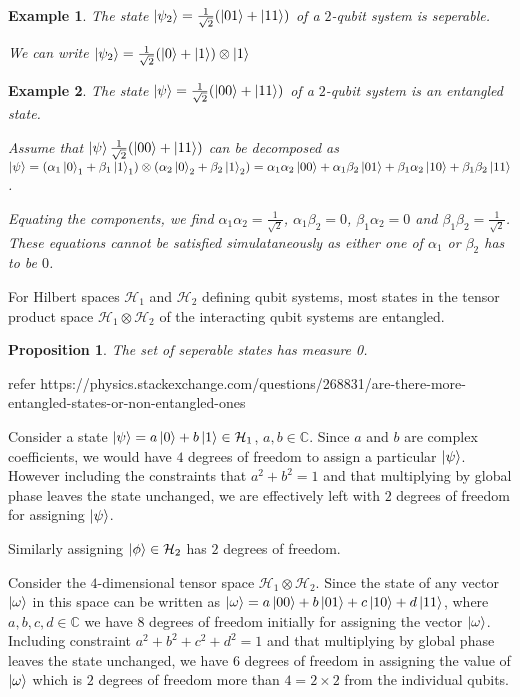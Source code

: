 \documentclass[12pt,twoside,fleqn]{report}
\makeatletter
\theoremstyle{thmstyle}
\renewenvironment{proof}[1][\proofname]{\par
\pushQED{\qed}%
\normalfont \topsep6\p@\@plus6\p@\relax
\trivlist
\item[\hskip\labelsep\itshape#1\@addpunct{.}]\mbox{}\par\nobreak\ignorespaces
}{%
    \popQED\endtrivlist\@endpefalse
    }
\newtheorem{eg}{Example}[chapter]
\newtheorem{prop}{Proposition}[chapter]
\makeatother
\begin{document}
\begin{eg}
The state $\ket{\psi_2} = \frac{1}{\sqrt{2}} (\ket{01} + \ket{11})$ of a $2$-qubit system is seperable. 

We can write $\ket{\psi_2} = \frac{1}{\sqrt{2}} (\ket{0} + \ket{1}) \otimes \ket{1}$
\end{eg}


\begin{eg}
The state $\ket{\psi} = \frac{1}{\sqrt{2}} (\ket{00} + \ket{11})$ of a $2$-qubit system is an entangled state.

    Assume that  $\ket{\psi} \frac{1}{\sqrt{2}} (\ket{00} + \ket{11}) $ can be decomposed as $\ket{\psi} = (\alpha_1 \ket{0}_1 + \beta_1 \ket{1}_1) \otimes (\alpha_2 \ket{0}_2 + \beta_2 \ket{1}_2) = \alpha_1 \alpha_2 \ket{00} + \alpha_1 \beta_2 \ket{01} + \beta_1 \alpha_2 \ket{10} + \beta_1 \beta_2 \ket{11}$.

    Equating the components, we find $\alpha_1 \alpha_2 = \displaystyle\frac{1}{\sqrt{2}}$, $\alpha_1 \beta_2 = 0$, $\beta_1 \alpha_2 = 0$ and $\beta_1 \beta_2 = \displaystyle\frac{1}{\sqrt{2}}$. These equations cannot be satisfied simulataneously as either one of $\alpha_1$ or $\beta_2$ has to be $0$.
\end{eg}


For Hilbert spaces $\mathcal{H}_1$ and $\mathcal{H}_2$ defining qubit systems, most states in the tensor product space $\mathcal{H}_1 \otimes \mathcal{H}_2$ of the interacting qubit systems are entangled.
\begin{prop}
    The set of seperable states has measure 0.
\end{prop}

\begin{proof}[intuition]
    refer https://physics.stackexchange.com/questions/268831/are-there-more-entangled-states-or-non-entangled-ones 

    Consider a state $\ket{\psi} = a \ket{0} + b \ket{1} \in \mathcal{H}_1$, $a,b \in \mathbb{C}$. Since $a$ and $b$ are complex coefficients, we would have $4$ degrees of freedom to assign a particular $\ket{\psi}$. However including the constraints that $a^2 + b^2 = 1$ and that multiplying by global phase leaves the state unchanged, we are effectively left with $2$ degrees of freedom for assigning $\ket{\psi}$. 
    
Similarly assigning $\ket{\phi} \in \mathcal{H}_2$ has $2$ degrees of freedom.

    Consider the $4$-dimensional tensor space $\mathcal{H}_1 \otimes \mathcal{H}_2$. Since the state of any vector $\ket{\omega}$ in this space can be written as $\ket{\omega} = a \ket{00} + b \ket{01} + c \ket{10} + d \ket{11}$, where $a, b, c, d \in \mathbb{C}$ we have $8$ degrees of freedom initially for assigning the vector $\ket{\omega}$. Including constraint $a^2 + b^2 + c^2 + d^2 = 1$ and that multiplying by global phase leaves the state unchanged, we have $6$ degrees of freedom in assigning the value of $\ket{\omega}$ which is $2$ degrees of freedom more than $4 = 2 \times 2$ from the individual qubits.
\end{proof}
\end{document}
